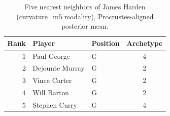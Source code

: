 \begin{table}[htbp]
  \centering\small
  \begin{tabular}{rllc}
    \toprule
    Rank & Player & Position & Archetype \\
    \midrule
    1 & Paul George & G & 4 \\
    2 & Dejounte Murray & G & 2 \\
    3 & Vince Carter & G & 2 \\
    4 & Will Barton & G & 2 \\
    5 & Stephen Curry & G & 4 \\
    \bottomrule
  \end{tabular}
  \caption{Five nearest neighbors of James Harden (curvature_m5 modality), Procrustes-aligned posterior mean.}
  \label{tab:James_Harden_neighbors_curvature_m5}
\end{table}

